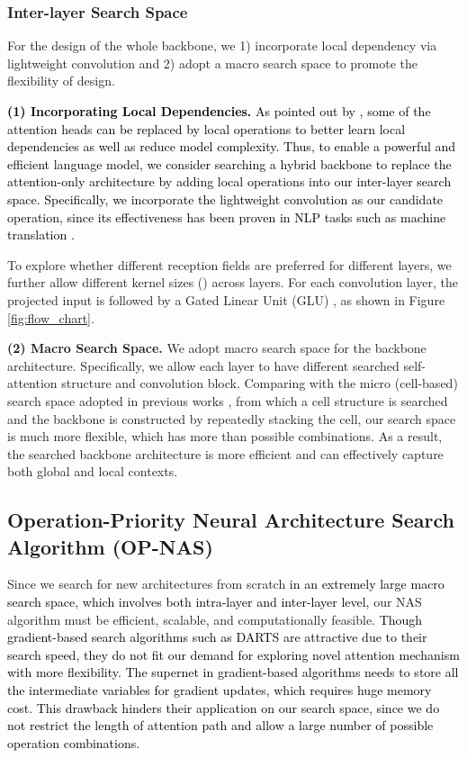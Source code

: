 \documentclass[letterpaper]{article} \usepackage{aaai22}  \usepackage{times}  \usepackage{helvet}  \usepackage{courier}  \usepackage[hyphens]{url}  \usepackage{graphicx} \urlstyle{rm} \def\UrlFont{\rm}  \usepackage{natbib}  \usepackage{caption} \DeclareCaptionStyle{ruled}{labelfont=normalfont,labelsep=colon,strut=off} \frenchspacing  \setlength{\pdfpagewidth}{8.5in}  \setlength{\pdfpageheight}{11in}  \usepackage{algorithm}
\newcommand{\prj}[1]{\textcolor{black}{#1}} \newcommand{\prjj}[1]{\textcolor{black}{#1}} \newcommand{\jhh}[1]{\textcolor{black}{#1}} \newcommand{\jh}[1]{\textcolor{black}{#1}} \newcommand{\sh}[1]{\textcolor{black}{#1}} \usepackage{multirow}
\begin{document}
\subsubsection{Inter-layer Search Space}
For the design of the whole backbone, we 1) incorporate local dependency via lightweight convolution and 2) adopt a macro search space to promote the flexibility of design.

\prj{\textbf{(1) Incorporating Local Dependencies.} As pointed out by \citep{jiang2020convbert,wu2018pay}, some of the attention heads can be replaced by local operations to better learn local dependencies as well as reduce model complexity.}
\prj{Thus, to enable a powerful and efficient language model, we consider searching a hybrid backbone to replace the attention-only architecture by adding local operations into
our inter-layer search space. Specifically, we incorporate the lightweight convolution as our candidate operation, since its effectiveness has been proven in NLP tasks such as machine
translation \citep{wu2018pay}.}

To explore whether different reception fields are preferred for different
layers, we further allow different kernel sizes
()
across layers. For each convolution layer, the projected input
is followed by a Gated Linear Unit (GLU) \citep{dauphin2017language},
as shown in Figure \ref{fig:flow_chart}.
\noindent



\textbf{(2) Macro Search Space.} We adopt macro search space for the backbone architecture. Specifically, we allow each layer to have different searched self-attention structure and convolution block. Comparing with the micro (cell-based) search space adopted in previous works \citep{liu2018darts, shi2020bridging}, from which a cell structure is searched and the backbone is constructed by repeatedly stacking the cell, our search space is much more flexible, which has more than  possible combinations. As a result, the searched backbone architecture is more efficient and can effectively capture both global and local contexts.


\subsection{
Operation-Priority Neural Architecture Search Algorithm\label{search_algor} (OP-NAS)
}



Since we search for new architectures from scratch \prj{in an extremely large macro search space, which involves both intra-layer and
inter-layer level,} 
our NAS algorithm must be efficient, scalable, and computationally feasible. \prjj{Though gradient-based search algorithms such as DARTS
are attractive due to their search speed, they do not fit our demand 
for exploring novel attention mechanism with more flexibility. 
The supernet in gradient-based algorithms needs to store all the intermediate variables for gradient updates, 
which requires huge memory cost.  This drawback hinders their application on our search space, since we do not restrict the length of attention path and allow a large number of possible operation combinations.
} 
\end{document}
